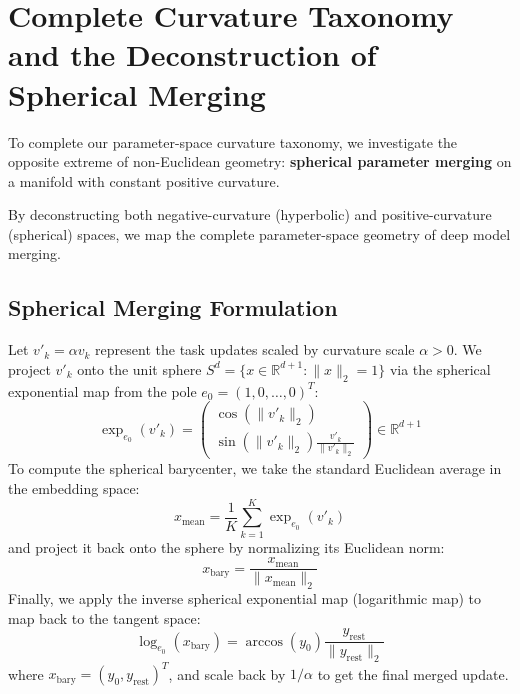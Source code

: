 \documentclass{article}
\theoremstyle{plain}
\theoremstyle{definition}
\theoremstyle{remark}
\begin{document}
\section{Complete Curvature Taxonomy and the Deconstruction of Spherical Merging}
To complete our parameter-space curvature taxonomy, we investigate the opposite extreme of non-Euclidean geometry: \textbf{spherical parameter merging} on a manifold with constant positive curvature. 

By deconstructing both negative-curvature (hyperbolic) and positive-curvature (spherical) spaces, we map the complete parameter-space geometry of deep model merging.

\subsection{Spherical Merging Formulation}
Let $v'_k = \alpha v_k$ represent the task updates scaled by curvature scale $\alpha > 0$. We project $v'_k$ onto the unit sphere $S^d = \{ x \in \mathbb{R}^{d+1} : \|x\|_2 = 1 \}$ via the spherical exponential map from the pole $e_0 = (1, 0, \dots, 0)^T$:
$$\exp_{e_0}(v'_k) = \begin{pmatrix} \cos(\|v'_k\|_2) \\ \sin(\|v'_k\|_2) \frac{v'_k}{\|v'_k\|_2} \end{pmatrix} \in \mathbb{R}^{d+1}$$
To compute the spherical barycenter, we take the standard Euclidean average in the embedding space:
$$x_{\text{mean}} = \frac{1}{K} \sum_{k=1}^K \exp_{e_0}(v'_k)$$
and project it back onto the sphere by normalizing its Euclidean norm:
$$x_{\text{bary}} = \frac{x_{\text{mean}}}{\|x_{\text{mean}}\|_2}$$
Finally, we apply the inverse spherical exponential map (logarithmic map) to map back to the tangent space:
$$\log_{e_0}(x_{\text{bary}}) = \arccos(y_0) \frac{y_{\text{rest}}}{\|y_{\text{rest}}\|_2}$$
where $x_{\text{bary}} = (y_0, y_{\text{rest}})^T$, and scale back by $1/\alpha$ to get the final merged update.
\end{document}
